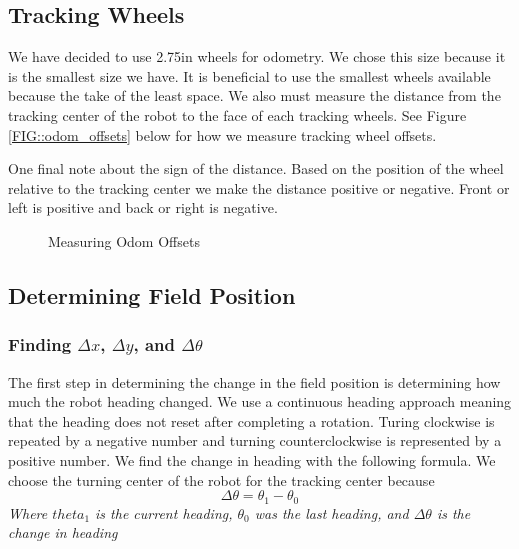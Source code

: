 \documentclass[12pt]{article}
\begin{document}
\subsection{Tracking Wheels}
We have decided to use 2.75in wheels for odometry. We chose this size because it is the smallest size we have. It is beneficial to use the smallest wheels available because the take of the least space. We also must measure the distance from the tracking center of the robot to the face of each tracking wheels. See Figure \ref{FIG::odom_offsets} below for how we measure tracking wheel offsets.

One final note about the sign of the distance. Based on the position of the wheel relative to the tracking center we make the distance positive or negative. Front or left is positive and back or right is negative.

\def\wheelSize{1.5}
\begin{figure}[h]
 \caption{Measuring Odom Offsets}
 \label{FIG::odom_offsets}
 \centering
 \label{odom_offset_diagram}
\end{figure}


\pagebreak
\subsection{Determining Field Position}
\subsubsection{Finding $\Delta x$, $\Delta y$, and $\Delta\theta$}
The first step in determining the change in the field position is determining how much the robot heading changed. We use a continuous heading approach meaning that the heading does not reset after completing a rotation. Turing clockwise is repeated by a negative number and turning counterclockwise is represented by a positive number. We find the change in heading with the following formula. We choose the turning center of the robot for the tracking center because
$$
    \Delta \theta = \theta_1-\theta_0
$$
\textit{Where $theta_1$ is the current heading, $\theta_0$ was the last heading, and $\Delta \theta$ is the change in heading}
\end{document}
